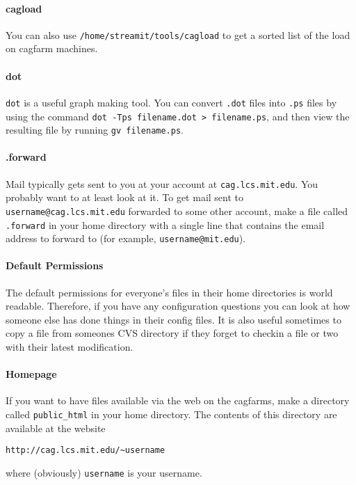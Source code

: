 \paragraph{cagload}

You can also use {\tt /home/streamit/tools/cagload} to get a sorted
list of the load on cagfarm machines.

\paragraph{dot}
\label{sec:dot}
{\tt dot} is a useful graph making tool. You can convert {\tt .dot}
files into {\tt .ps} files by using the command {\tt dot -Tps
  filename.dot > filename.ps}, and then view the resulting file by
running {\tt gv filename.ps}.

\paragraph{.forward}
Mail typically gets sent to you at your account at {\tt cag.lcs.mit.edu}. 
You probably want to
at least look at it. To get mail sent to {\tt username@cag.lcs.mit.edu}
forwarded to some other account, make a file called {\tt .forward}
in your home directory with a single line that contains the email address
to forward to (for example, {\tt username@mit.edu}).

\paragraph{Default Permissions}
The default permissions for everyone's files in their home directories
is world readable. Therefore, if you have any configuration questions 
you can look at how someone else has done things in their config files.
It is also useful sometimes to copy a file from someones
CVS directory if they forget to checkin a file or two with their
latest modification.

\paragraph{Homepage}
If you want to have files available via the web on the cagfarms, make
a directory called {\tt public\_html} in your home directory. The contents
of this directory are available at the website \\
\begin{verbatim}
http://cag.lcs.mit.edu/~username
\end{verbatim}
 where (obviously) {\tt username} is your username.

